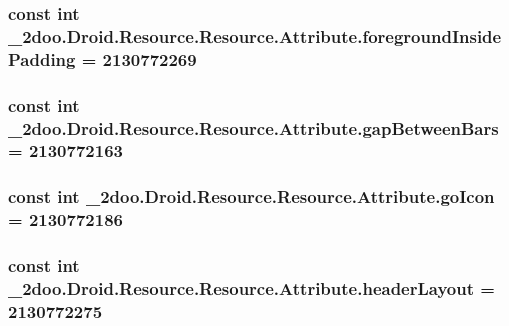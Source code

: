 \hypertarget{class__2doo_1_1_droid_1_1_resource_1_1_attribute_e20a01e3e20652aaa355fd15caaf2aa3}{
\subsubsection[{foregroundInsidePadding}]{\setlength{\rightskip}{0pt plus 5cm}const int \_\-2doo.Droid.Resource.Resource.Attribute.foregroundInsidePadding = 2130772269}}
\label{class__2doo_1_1_droid_1_1_resource_1_1_attribute_e20a01e3e20652aaa355fd15caaf2aa3}


\hypertarget{class__2doo_1_1_droid_1_1_resource_1_1_attribute_dbe03b0875439b691e423f430f5a4ed6}{
\subsubsection[{gapBetweenBars}]{\setlength{\rightskip}{0pt plus 5cm}const int \_\-2doo.Droid.Resource.Resource.Attribute.gapBetweenBars = 2130772163}}
\label{class__2doo_1_1_droid_1_1_resource_1_1_attribute_dbe03b0875439b691e423f430f5a4ed6}


\hypertarget{class__2doo_1_1_droid_1_1_resource_1_1_attribute_bcaa1a3da0b4109e45787efc3d4af0cf}{
\subsubsection[{goIcon}]{\setlength{\rightskip}{0pt plus 5cm}const int \_\-2doo.Droid.Resource.Resource.Attribute.goIcon = 2130772186}}
\label{class__2doo_1_1_droid_1_1_resource_1_1_attribute_bcaa1a3da0b4109e45787efc3d4af0cf}


\hypertarget{class__2doo_1_1_droid_1_1_resource_1_1_attribute_fe67b47cd7e00177f42f1932a7190c18}{
\subsubsection[{headerLayout}]{\setlength{\rightskip}{0pt plus 5cm}const int \_\-2doo.Droid.Resource.Resource.Attribute.headerLayout = 2130772275}}
\label{class__2doo_1_1_droid_1_1_resource_1_1_attribute_fe67b47cd7e00177f42f1932a7190c18}


